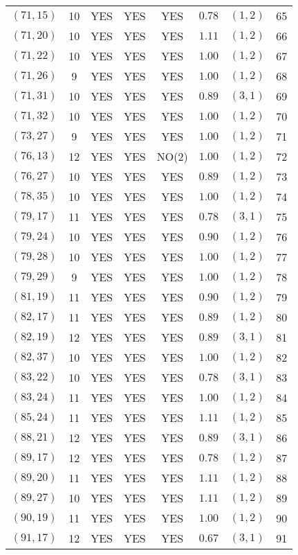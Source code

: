 \begin{longtable}{|c|c|c|c|c|c|c|c|}
$(71,15)$ & 10 & YES & YES & YES & $0.78$ & $(1,2)$ & 65\\
$(71,20)$ & 10 & YES & YES & YES & $1.11$ & $(1,2)$ & 66\\
$(71,22)$ & 10 & YES & YES & YES & $1.00$ & $(1,2)$ & 67\\
$(71,26)$ & 9 & YES & YES & YES & $1.00$ & $(1,2)$ & 68\\
$(71,31)$ & 10 & YES & YES & YES & $0.89$ & $(3,1)$ & 69\\
$(71,32)$ & 10 & YES & YES & YES & $1.00$ & $(1,2)$ & 70\\
$(73,27)$ & 9 & YES & YES & YES & $1.00$ & $(1,2)$ & 71\\
$(76,13)$ & 12 & YES & YES & NO(2) & $1.00$ & $(1,2)$ & 72\\
$(76,27)$ & 10 & YES & YES & YES & $0.89$ & $(1,2)$ & 73\\
$(78,35)$ & 10 & YES & YES & YES & $1.00$ & $(1,2)$ & 74\\
$(79,17)$ & 11 & YES & YES & YES & $0.78$ & $(3,1)$ & 75\\
$(79,24)$ & 10 & YES & YES & YES & $0.90$ & $(1,2)$ & 76\\
$(79,28)$ & 10 & YES & YES & YES & $1.00$ & $(1,2)$ & 77\\
$(79,29)$ & 9 & YES & YES & YES & $1.00$ & $(1,2)$ & 78\\
$(81,19)$ & 11 & YES & YES & YES & $0.90$ & $(1,2)$ & 79\\
$(82,17)$ & 11 & YES & YES & YES & $0.89$ & $(1,2)$ & 80\\
$(82,19)$ & 12 & YES & YES & YES & $0.89$ & $(3,1)$ & 81\\
$(82,37)$ & 10 & YES & YES & YES & $1.00$ & $(1,2)$ & 82\\
$(83,22)$ & 10 & YES & YES & YES & $0.78$ & $(3,1)$ & 83\\
$(83,24)$ & 11 & YES & YES & YES & $1.00$ & $(1,2)$ & 84\\
$(85,24)$ & 11 & YES & YES & YES & $1.11$ & $(1,2)$ & 85\\
$(88,21)$ & 12 & YES & YES & YES & $0.89$ & $(3,1)$ & 86\\
$(89,17)$ & 12 & YES & YES & YES & $0.78$ & $(1,2)$ & 87\\
$(89,20)$ & 11 & YES & YES & YES & $1.11$ & $(1,2)$ & 88\\
$(89,27)$ & 10 & YES & YES & YES & $1.11$ & $(1,2)$ & 89\\
$(90,19)$ & 11 & YES & YES & YES & $1.00$ & $(1,2)$ & 90\\
$(91,17)$ & 12 & YES & YES & YES & $0.67$ & $(3,1)$ & 91\\

\end{longtable}
